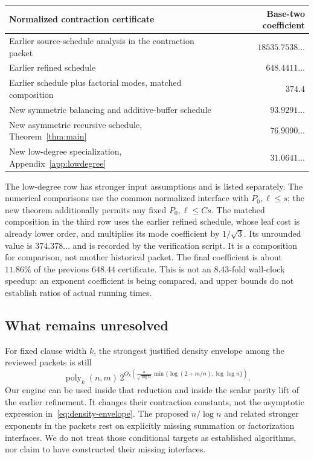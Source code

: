 \documentclass[11pt,letterpaper]{article}
\theoremstyle{remark}\newtheorem{remark}[theorem]{Remark}
\newcommand{\poly}{\operatorname{poly}}
\begin{document}
\begin{center}
\begin{tabular}{@{}p{}r@{}}
\toprule
Normalized contraction certificate & Base-two coefficient\\
\midrule
Earlier source-schedule analysis in the contraction packet & $18535.7538\ldots$\\
Earlier refined schedule \cite{contractionpacket} & $648.4411\ldots$\\
Earlier schedule plus factorial modes, matched composition & $374.4$\\
New symmetric balancing and additive-buffer schedule & $93.9291\ldots$\\
New asymmetric recursive schedule, Theorem~\ref{thm:main} & $76.9090\ldots$\\
New low-degree specialization, Appendix~\ref{app:lowdegree} & $31.0641\ldots$\\
\bottomrule
\end{tabular}
\end{center}
The low-degree row has stronger input assumptions and is listed separately.
The numerical comparisons use the common normalized interface with
$P_0,\ell\le s$; the new theorem additionally permits any fixed
$P_0,\ell\le Cs$.
The matched composition in the third row uses the earlier refined
schedule, whose leaf cost is already lower order, and multiplies its
mode coefficient by $1/\sqrt3$. Its unrounded value is
$374.378\ldots$ and is recorded by the verification script. It is a composition for comparison, not another
historical packet. The final coefficient is about $11.86\%$ of the
previous $648.44$ certificate. This is not an $8.43$-fold wall-clock
speedup: an exponent coefficient is being compared, and upper bounds do
not establish ratios of actual running times.

\subsection{What remains unresolved}
For fixed clause width $k$, the strongest justified density envelope
among the reviewed packets is still
\begin{equation}\label{eq:density-envelope}
 \poly_k(n,m)\,
 2^{O_k\left(\frac{n}{\sqrt{\log n}}
      \min\{\log(2+m/n),\log\log n\}\right)}.
\end{equation}
Our engine can be used inside that reduction and inside the scalar parity
lift of the earlier refinement. It changes their contraction constants,
not the asymptotic expression in~\eqref{eq:density-envelope}.
The proposed $n/\log n$ and related stronger exponents in the packets
rest on explicitly missing summation or factorization interfaces. We do
not treat those conditional targets as established algorithms, nor claim
to have constructed their missing interfaces.
\end{document}
